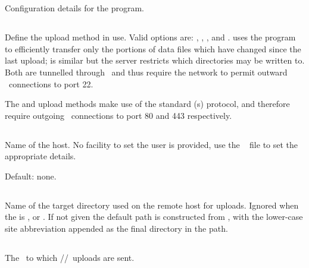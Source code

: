 \section{\code{[upload]}}
Configuration details for the  program.

\subsection{}
Define the upload method in use. Valid options are: ,
, , and .  uses the
 program to efficiently transfer only the portions of
data files which have changed since the last upload;  is
similar but the server restricts which directories may be written
to. Both are tunnelled through \ssh\ and thus require the network to
permit outward \tcp\ connections to port 22.

The  and  upload methods make use of the standard
\http(s) protocol, and therefore require outgoing \tcp\ connections to
port 80 and 443 respectively.

\subsection{}
Name of the  host. No facility to set the user is
provided, use the \ssh\  file to set the
appropriate details.

Default: none.


\subsection{}
Name of the target directory used on the remote host for 
uploads. Ignored when the  is , 
or . If not given the default path is constructed from
, with the lower-case site
abbreviation appended as the final directory in the path.

\subsection{}
The \URL\ to which \http/\slash \https\ uploads are sent.

